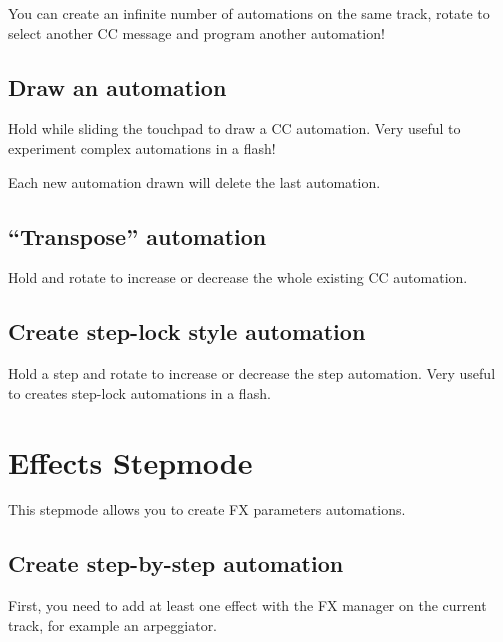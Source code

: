 

You can create an infinite number of automations on the same track, rotate \encodericon{} to select another CC message and program another automation!

\subsection{Draw an automation}

Hold  while sliding the touchpad to draw a CC automation. Very useful to experiment complex automations in a flash!


Each new automation drawn will delete the last automation.

\subsection{“Transpose” automation}

Hold  and rotate \encodericon{} to increase or decrease the whole existing CC automation.

\subsection{Create step-lock style automation}

Hold a step \stepbystepicon{} and rotate \encodericon{} to increase or decrease the step automation. Very useful to creates step-lock automations in a flash.



\section{Effects Stepmode}

This stepmode allows you to create FX parameters automations.

\subsection{Create step-by-step automation}

First, you need to add at least one effect with the FX manager on the current track, for example an arpeggiator.

